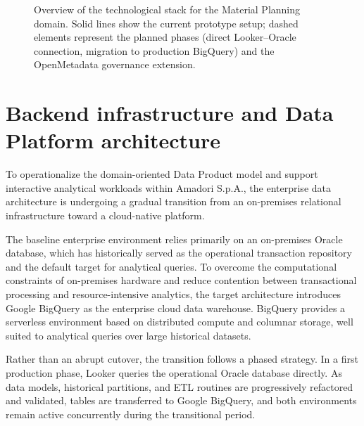 \begin{figure}[htbp]
{%
    }
    \caption{Overview of the technological stack for the Material Planning domain. Solid lines show the current prototype setup; dashed elements represent the planned phases (direct Looker--Oracle connection, migration to production BigQuery) and the OpenMetadata governance extension.}
    \label{fig:techstack_overview}
\end{figure}

\section[Backend Infrastructure]{Backend infrastructure and Data Platform architecture}
\label{sec:backend_infrastructure}

To operationalize the domain-oriented Data Product model and support interactive analytical workloads within Amadori S.p.A.,
the enterprise data architecture is undergoing a gradual transition from an on-premises relational infrastructure toward a cloud-native platform.

The baseline enterprise environment relies primarily on an on-premises Oracle database, which has historically served as the operational transaction
repository and the default target for analytical queries. To overcome the computational constraints of on-premises hardware and reduce
contention between transactional processing and resource-intensive analytics, the target architecture introduces Google BigQuery as the enterprise cloud data warehouse.
BigQuery provides a serverless environment based on distributed compute and columnar storage, well suited to analytical queries over large historical datasets.

Rather than an abrupt cutover, the transition follows a phased strategy.
In a first production phase, Looker queries the operational Oracle database directly.
As data models, historical partitions, and ETL routines are progressively refactored and validated, tables are transferred to Google BigQuery,
and both environments remain active concurrently during the transitional period.

